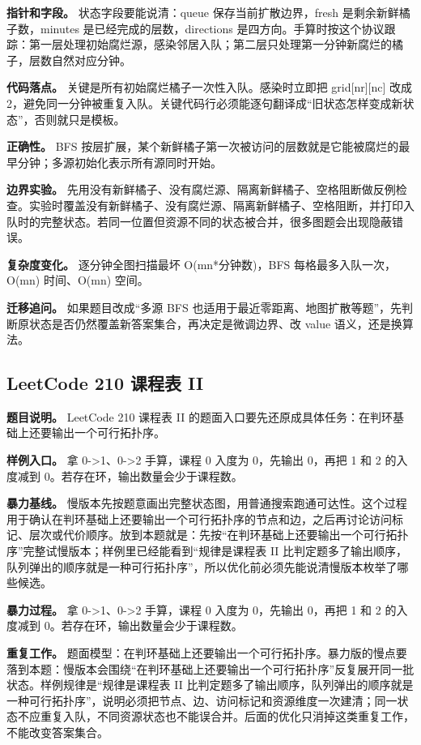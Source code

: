 \textbf{指针和字段。} 状态字段要能说清：queue 保存当前扩散边界，fresh 是剩余新鲜橘子数，minutes 是已经完成的层数，directions 是四方向。手算时按这个协议跟踪：第一层处理初始腐烂源，感染邻居入队；第二层只处理第一分钟新腐烂的橘子，层数自然对应分钟。

\textbf{代码落点。} 关键是所有初始腐烂橘子一次性入队。感染时立即把 grid[nr][nc] 改成 2，避免同一分钟被重复入队。关键代码行必须能逐句翻译成“旧状态怎样变成新状态”，否则就只是模板。

\textbf{正确性。} BFS 按层扩展，某个新鲜橘子第一次被访问的层数就是它能被腐烂的最早分钟；多源初始化表示所有源同时开始。

\textbf{边界实验。} 先用没有新鲜橘子、没有腐烂源、隔离新鲜橘子、空格阻断做反例检查。实验时覆盖没有新鲜橘子、没有腐烂源、隔离新鲜橘子、空格阻断，并打印入队时的完整状态。若同一位置但资源不同的状态被合并，很多图题会出现隐蔽错误。

\textbf{复杂度变化。} 逐分钟全图扫描最坏 O(mn*分钟数)，BFS 每格最多入队一次，O(mn) 时间、O(mn) 空间。

\textbf{迁移追问。} 如果题目改成“多源 BFS 也适用于最近零距离、地图扩散等题”，先判断原状态是否仍然覆盖新答案集合，再决定是微调边界、改 value 语义，还是换算法。

\subsection{LeetCode 210 课程表 II}

\textbf{题目说明。} LeetCode 210 课程表 II 的题面入口要先还原成具体任务：在判环基础上还要输出一个可行拓扑序。

\textbf{样例入口。} 拿 0->1、0->2 手算，课程 0 入度为 0，先输出 0，再把 1 和 2 的入度减到 0。若存在环，输出数量会少于课程数。

\textbf{暴力基线。} 慢版本先按题意画出完整状态图，用普通搜索跑通可达性。这个过程用于确认在判环基础上还要输出一个可行拓扑序的节点和边，之后再讨论访问标记、层次或代价顺序。放到本题就是：先按“在判环基础上还要输出一个可行拓扑序”完整试慢版本；样例里已经能看到“规律是课程表 II 比判定题多了输出顺序，队列弹出的顺序就是一种可行拓扑序”，所以优化前必须先能说清慢版本枚举了哪些候选。

\textbf{暴力过程。} 拿 0->1、0->2 手算，课程 0 入度为 0，先输出 0，再把 1 和 2 的入度减到 0。若存在环，输出数量会少于课程数。

\textbf{重复工作。} 题面模型：在判环基础上还要输出一个可行拓扑序。暴力版的慢点要落到本题：慢版本会围绕“在判环基础上还要输出一个可行拓扑序”反复展开同一批状态。样例规律是“规律是课程表 II 比判定题多了输出顺序，队列弹出的顺序就是一种可行拓扑序”，说明必须把节点、边、访问标记和资源维度一次建清；同一状态不应重复入队，不同资源状态也不能误合并。后面的优化只消掉这类重复工作，不能改变答案集合。

